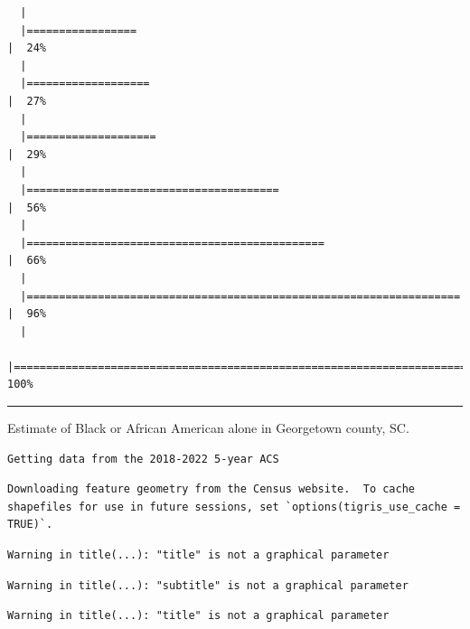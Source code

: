 \documentclass[
  letterpaper,
  DIV=11,
  numbers=noendperiod]{scrartcl}
\begin{document}
\begin{verbatim}
  |                                                                            
  |=================                                                     |  24%
  |                                                                            
  |===================                                                   |  27%
  |                                                                            
  |====================                                                  |  29%
  |                                                                            
  |=======================================                               |  56%
  |                                                                            
  |==============================================                        |  66%
  |                                                                            
  |===================================================================   |  96%
  |                                                                            
  |======================================================================| 100%
\end{verbatim}

\begin{center}\rule{0.5\linewidth}{0.5pt}\end{center}

Estimate of Black or African American alone in Georgetown county, SC.

\begin{verbatim}
Getting data from the 2018-2022 5-year ACS
\end{verbatim}

\begin{verbatim}
Downloading feature geometry from the Census website.  To cache shapefiles for use in future sessions, set `options(tigris_use_cache = TRUE)`.
\end{verbatim}

\begin{verbatim}
Warning in title(...): "title" is not a graphical parameter
\end{verbatim}

\begin{verbatim}
Warning in title(...): "subtitle" is not a graphical parameter
\end{verbatim}

\begin{verbatim}
Warning in title(...): "title" is not a graphical parameter
\end{verbatim}
\end{document}
